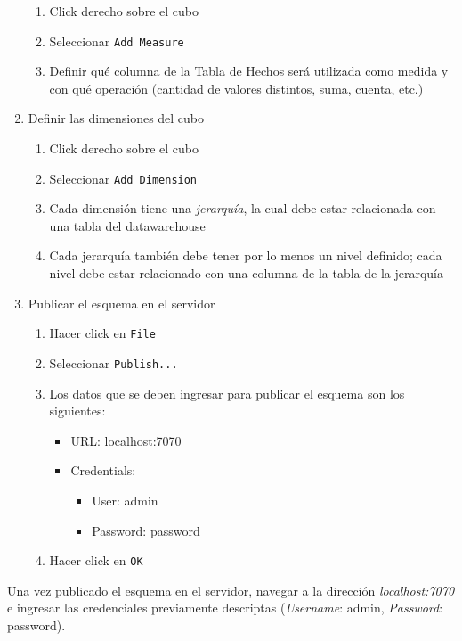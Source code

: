 \begin{enumerate}
    \begin{enumerate}
        \item Click derecho sobre el cubo
        \item Seleccionar \texttt{Add Measure}
        \item Definir qué columna de la Tabla de Hechos será utilizada como medida y con qué operación (cantidad de valores distintos, suma, cuenta, etc.)
    \end{enumerate}
    \item Definir las dimensiones del cubo
    \begin{enumerate}
        \item Click derecho sobre el cubo
        \item Seleccionar \texttt{Add Dimension}
        \item Cada dimensión tiene una \emph{jerarquía}, la cual debe estar relacionada con una tabla del datawarehouse 
        \item Cada jerarquía también debe tener por lo menos un nivel definido; cada nivel debe estar relacionado con una columna de la tabla de la jerarquía
    \end{enumerate}
    \item Publicar el esquema en el servidor
    \begin{enumerate}
        \item Hacer click en \texttt{File}
        \item Seleccionar \texttt{Publish...}
        \item Los datos que se deben ingresar para publicar el esquema son los siguientes:
        \begin{itemize}
            \item URL: localhost:7070
            \item Credentials:
                \begin{itemize}
                    \item User: admin
                    \item Password: password
                \end{itemize}
        \end{itemize}
        \item Hacer click en \texttt{OK}
    \end{enumerate}
\end{enumerate}

Una vez publicado el esquema en el servidor, navegar a la dirección \emph{localhost:7070} e ingresar las credenciales previamente descriptas (\emph{Username}: admin, \emph{Password}: password). 


